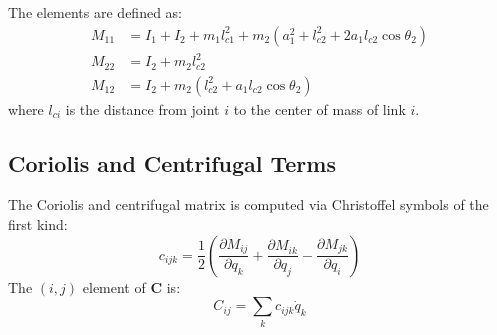 \documentclass{article}
\begin{document}
The elements are defined as:
\begin{align}
M_{11} &= I_1 + I_2 + m_1 l_{c1}^2 + m_2(a_1^2 + l_{c2}^2 + 2a_1 l_{c2} \cos\theta_2) \nonumber \\
M_{22} &= I_2 + m_2 l_{c2}^2 \nonumber \\
M_{12} &= I_2 + m_2(l_{c2}^2 + a_1 l_{c2} \cos\theta_2) \tag{7.6}
\end{align}
where $l_{ci}$ is the distance from joint $i$ to the center of mass of link $i$.

\subsection{Coriolis and Centrifugal Terms}
The Coriolis and centrifugal matrix is computed via Christoffel symbols of the first kind:
\begin{equation}
c_{ijk} = \frac{1}{2} \left( \frac{\partial M_{ij}}{\partial q_k} + \frac{\partial M_{ik}}{\partial q_j} - \frac{\partial M_{jk}}{\partial q_i} \right) \tag{7.7}
\end{equation}
The $(i,j)$ element of $\mathbf{C}$ is:
\begin{equation}
    C_{ij} = \sum_{k} c_{ijk} \dot{q}_k \tag{7.8}
\end{equation}
\end{document}
